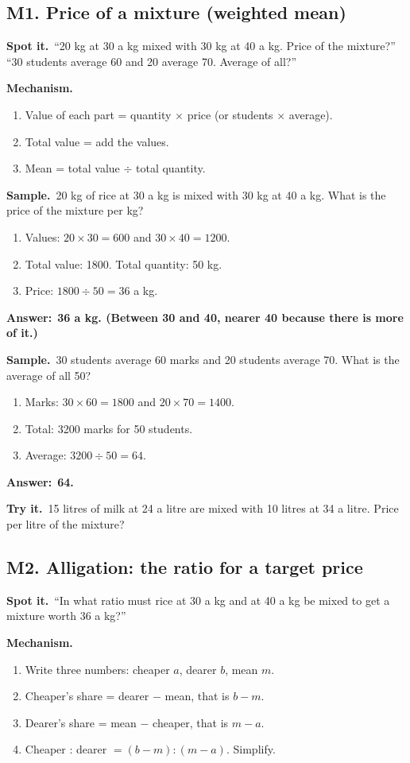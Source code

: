 \documentclass[11pt,a4paper]{article}
\let\oldsubsection\subsection
\renewcommand{\subsection}{\needspace{9\baselineskip}\oldsubsection}
\newcommand{\spot}{\textbf{\color{ember}Spot it.}\ }
\newcommand{\mech}{\textbf{\color{ember}Mechanism.}\ }
\newif\ifkeepsamp
\newcommand{\ans}[1]{\par\nopagebreak\noindent\textbf{\color{ember}Answer:}\ \textbf{#1}\par}
\newcommand{\samp}{\ifkeepsamp\needspace{4\baselineskip}\fi\textbf{\color{ember}Sample.}\ }
\newcommand{\tryit}[1]{\textbf{\color{ember}Try it.}\ #1}
\begin{document}
\subsection{M1. Price of a mixture (weighted mean)}
\spot ``20 kg at 30 a kg mixed with 30 kg at 40 a kg. Price of the mixture?'' ``30 students average 60 and 20 average 70. Average of all?''

\mech
\begin{enumerate}
\item Value of each part = quantity $\times$ price (or students $\times$ average).
\item Total value = add the values.
\item Mean = total value $\div$ total quantity.
\end{enumerate}

\samp 20 kg of rice at 30 a kg is mixed with 30 kg at 40 a kg. What is the price of the mixture per kg?
\begin{enumerate}
\item Values: $20 \times 30 = 600$ and $30 \times 40 = 1200$.
\item Total value: 1800. Total quantity: 50 kg.
\item Price: $1800 \div 50 = 36$ a kg.
\end{enumerate}
\ans{36 a kg. (Between 30 and 40, nearer 40 because there is more of it.)}

\samp 30 students average 60 marks and 20 students average 70. What is the average of all 50?
\begin{enumerate}
\item Marks: $30 \times 60 = 1800$ and $20 \times 70 = 1400$.
\item Total: 3200 marks for 50 students.
\item Average: $3200 \div 50 = 64$.
\end{enumerate}
\ans{64.}

\tryit 15 litres of milk at 24 a litre are mixed with 10 litres at 34 a litre. Price per litre of the mixture?

\subsection{M2. Alligation: the ratio for a target price}
\spot ``In what ratio must rice at 30 a kg and at 40 a kg be mixed to get a mixture worth 36 a kg?''

\mech
\begin{enumerate}
\item Write three numbers: cheaper $a$, dearer $b$, mean $m$.
\item Cheaper's share = dearer $-$ mean, that is $b - m$.
\item Dearer's share = mean $-$ cheaper, that is $m - a$.
\item Cheaper : dearer $= (b - m) : (m - a)$. Simplify.
\end{enumerate}
\end{document}
